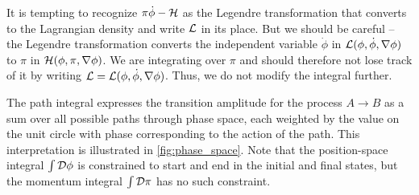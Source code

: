 It is tempting to recognize $\pi \dot\phi - \mathcal{H}$ as the Legendre transformation that converts to the Lagrangian density and write $\lagr$ in its place.
But we should be careful -- the Legendre transformation converts the independent variable $\dot\phi$ in $\mathcal{L}(\phi, \dot\phi, \nabla\phi)$ to $\pi$ in $\mathcal{H}(\phi, \pi, \nabla\phi)$.
We are integrating over $\pi$ and should therefore not lose track of it by writing $\mathcal{L} = \mathcal{L}(\phi, \dot\phi, \nabla\phi)$.
Thus, we do not modify the integral further.


\iffalse
Note that the combination of the Hamiltonian and the fields in the exponential is precisely the Legendre transformation that converts between the Hamiltonian density $\ham$ and the Lagrangian density $\lagr$.
Thus, we might as well express the transition amplitude as the \textbf{path integral}
\begin{equation}
	\transampl = \int \pathintdif \pi \int_{\phi_A(\vec{x})}^{\phi_B(\vec{x})} \pathintdif \phi \, \exp \big( i S \left[ \pi(\vec{x}, t), \phi(\vec{x}, t) \right] / \hbar \big) ,
\label{eq:tft:path_integral_lagrangian}
\end{equation}
with the action
\begin{equation}
	S \left[ \pi(\vec{x}, t), \phi(\vec{x}, t) \right] = \int_0^T \dif t \int \dif^3 x \, \lagr \left( \pi(\vec{x}, t), \phi(\vec{x}, t) \right) . \qquad \text{TODO: factor $c$?}
\label{eq:tft:action}
\end{equation}
\fi
The path integral expresses the transition amplitude for the process $A \rightarrow B$ as a sum over all possible paths through phase space, each weighted by the value on the unit circle with phase corresponding to the action of the path.
This interpretation is illustrated in \cref{fig:phase_space}.
Note that the position-space integral $\int \mathcal{D} \phi$ is constrained to start and end in the initial and final states, but the momentum integral $\int \mathcal{D} \pi$ has no such constraint.

